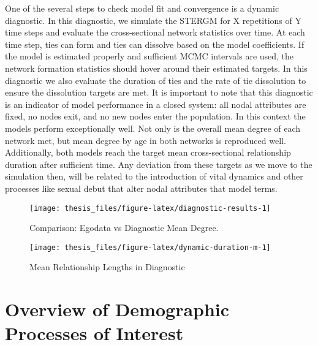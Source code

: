 \documentclass [11pt, proquest] {uwthesis}[2015/03/03]
\begin{document}
One of the several steps to check model fit and convergence is a dynamic
diagnostic. In this diagnostic, we simulate the STERGM for X repetitions
of Y time steps and evaluate the cross-sectional network statistics over
time. At each time step, ties can form and ties can dissolve based on
the model coefficients. If the model is estimated properly and
sufficient MCMC intervals are used, the network formation statistics
should hover around their estimated targets. In this diagnostic we also
evaluate the duration of ties and the rate of tie dissolution to ensure
the dissolution targets are met. It is important to note that this
diagnostic is an indicator of model performance in a closed system: all
nodal attributes are fixed, no nodes exit, and no new nodes enter the
population. In this context the models perform exceptionally well. Not
only is the overall mean degree of each network met, but mean degree by
age in both networks is reproduced well. Additionally, both models reach
the target mean cross-sectional relationship duration after sufficient
time. Any deviation from these targets as we move to the simulation
then, will be related to the introduction of vital dynamics and other
processes like sexual debut that alter nodal attributes that model
terms.
\begin{figure}

{\centering \texttt{[image: thesis\_files/figure-latex/diagnostic-results-1]} 

}

\caption{Comparison: Egodata vs Diagnostic Mean Degree.}\label{fig:diagnostic-results}
\end{figure}
\begin{figure}

{\centering \texttt{[image: thesis\_files/figure-latex/dynamic-duration-m-1]} 

}

\caption{Mean Relationship Lengths in Diagnostic}\label{fig:dynamic-duration-m}
\end{figure}
\section{Overview of Demographic Processes of
Interest}\label{overview-of-demographic-processes-of-interest}
\end{document}
